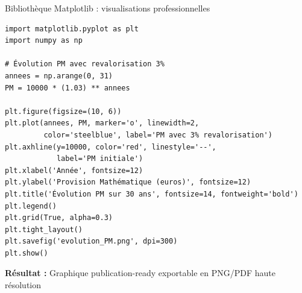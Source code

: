 \documentclass[10pt,aspectratio=169]{beamer}
\begin{document}
\begin{frame}[fragile]{Bibliothèque Matplotlib : visualisations professionnelles}
\begin{lstlisting}
import matplotlib.pyplot as plt
import numpy as np

# Évolution PM avec revalorisation 3%
annees = np.arange(0, 31)
PM = 10000 * (1.03) ** annees

plt.figure(figsize=(10, 6))
plt.plot(annees, PM, marker='o', linewidth=2, 
         color='steelblue', label='PM avec 3% revalorisation')
plt.axhline(y=10000, color='red', linestyle='--', 
            label='PM initiale')
plt.xlabel('Année', fontsize=12)
plt.ylabel('Provision Mathématique (euros)', fontsize=12)
plt.title('Évolution PM sur 30 ans', fontsize=14, fontweight='bold')
plt.legend()
plt.grid(True, alpha=0.3)
plt.tight_layout()
plt.savefig('evolution_PM.png', dpi=300)
plt.show()
\end{lstlisting}

\textbf{Résultat :} Graphique publication-ready exportable en PNG/PDF haute résolution
\end{frame}
\end{document}
